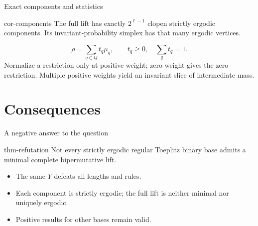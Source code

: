 \documentclass{beamer}
\begin{document}
\begin{frame}{Exact components and statistics}

\begin{bookresult}{cor-components}
The full lift has exactly $2^{\ell-1}$ clopen strictly ergodic components. Its invariant-probability simplex has that many ergodic vertices.
\end{bookresult}
\[
\rho=\sum_{q\in Q}t_q\mu_q,\qquad t_q\geq0,\quad\sum_qt_q=1.
\]
Normalize a restriction only at positive weight; zero weight gives the zero restriction. Multiple positive weights yield an invariant slice of intermediate mass.
\end{frame}

\section{Consequences}

\begin{frame}{A negative answer to the question}

\begin{bookresult}{thm-refutation}
Not every strictly ergodic regular Toeplitz binary base admits a minimal complete bipermutative lift.
\end{bookresult}
\begin{itemize}
\item The same $Y$ defeats all lengths and rules.
\item Each component is strictly ergodic; the full lift is neither minimal nor uniquely ergodic.
\item Positive results for other bases remain valid.
\end{itemize}
\end{frame}

\appendix
\end{document}
